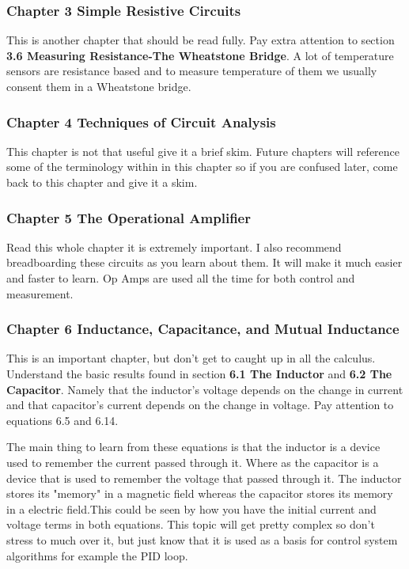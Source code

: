 \documentclass[11pt]{article}
\begin{document}
\subsubsection{Chapter 3 Simple Resistive Circuits}
\label{sec:org63aa7d4}
This is another chapter that should be read fully. Pay extra attention to section
\textbf{3.6 Measuring Resistance-The Wheatstone Bridge}. A lot of temperature sensors are resistance based
and to measure temperature of them we usually consent them in a Wheatstone bridge.
\subsubsection{Chapter 4 Techniques of Circuit Analysis}
\label{sec:orgf13b228}
This chapter is not that useful give it a brief skim. Future chapters will reference some of the
terminology within in this chapter so if you are confused later, come back to this chapter and give
it a skim.
\subsubsection{Chapter 5 The Operational Amplifier}
\label{sec:org6c85367}
Read this whole chapter it is extremely important. I also recommend breadboarding these circuits as
you learn about them. It will make it much easier and faster to learn. Op Amps are used all the time
for both control and measurement.
\subsubsection{Chapter 6 Inductance, Capacitance, and Mutual Inductance}
\label{sec:org8fc087c}
This is an important chapter, but don't get to caught up in all the calculus. Understand the basic
results found in section \textbf{6.1 The Inductor} and \textbf{6.2 The Capacitor}. Namely that the inductor's
voltage depends on the change in current and that capacitor's current depends on the change in
voltage. Pay attention to equations 6.5 and 6.14.

The main thing to learn from these equations is that the inductor is a device used to remember the
current passed through it. Where as the capacitor is a device that is used to remember the voltage
that passed through it. The inductor stores its "memory" in a magnetic field whereas the capacitor
stores its memory in a electric field.This could be seen by how you have the initial current and
voltage terms in both equations. This topic will get pretty complex so don't stress to much over it,
but just know that it is used as a basis for control system algorithms for example the PID loop.
\end{document}
